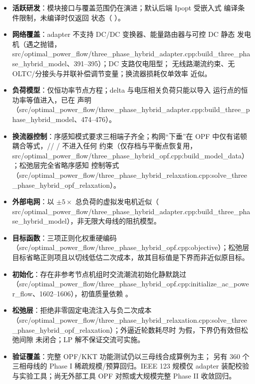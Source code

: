 \begin{itemize}
  \item \textbf{活跃研发}：模块接口与覆盖范围仍在演进；默认后端 Ipopt 受嵌入式
        编译条件限制，未编译时仅返回  状态（
        ）。
  \item \textbf{网络覆盖}：adapter 不支持 DC/DC 变换器、能量路由器与可控 DC 静态
        发电机（遇之抛错，src/optimal\_power\_flow/three\_phase\_hybrid\_adapter.cpp:build\_three\_phase\_hybrid\_model、391--395）；DC 支路仅电阻型；
        无线路潮流约束、无 OLTC/分接头与并联补偿调节变量；换流器损耗仅单效率
        近似。
  \item \textbf{负荷模型}：仅恒功率节点方程；delta 与电压相关负荷只能以导入
        运行点的恒功率等值进入，已在  声明
        （src/optimal\_power\_flow/three\_phase\_hybrid\_adapter.cpp:build\_three\_phase\_hybrid\_model、474--476）。
  \item \textbf{换流器控制}：序感知模式要求三相端子齐全；构网“下垂”在 OPF
        中仅有诺顿耦合等式，//%
        / 不进入任何
        约束（仅存档与平衡点恢复用，src/optimal\_power\_flow/three\_phase\_hybrid\_opf.cpp:build\_model\_data）；松弛层完全省略序感知
        控制等式（src/optimal\_power\_flow/three\_phase\_hybrid\_relaxation.cpp:solve\_three\_phase\_hybrid\_opf\_relaxation）。
  \item \textbf{外部电网}：以 $\pm5\times$ 总负荷的虚拟发电机近似（
        src/optimal\_power\_flow/three\_phase\_hybrid\_adapter.cpp:build\_three\_phase\_hybrid\_model），非无限大母线的阻抗模型。
  \item \textbf{目标函数}：三项正则化权重硬编码（src/optimal\_power\_flow/three\_phase\_hybrid\_opf.cpp:objective）；松弛层
        目标省略正则项且以切线低估二次成本，故其目标值是下界而非近似原目标。
  \item \textbf{初始化}：存在非参考节点机组时交流潮流初始化静默跳过
        （src/optimal\_power\_flow/three\_phase\_hybrid\_opf.cpp:initialize\_ac\_power\_flow、1602--1606），初值质量依赖 。
  \item \textbf{松弛层}：拒绝非零固定电流注入与负二次成本
        （src/optimal\_power\_flow/three\_phase\_hybrid\_relaxation.cpp:solve\_three\_phase\_hybrid\_opf\_relaxation）；外逼近轮数耗尽时
         为假，下界仍有效但松弛间隙
        未闭合；LP 解不保证交流可实施。
  \item \textbf{验证覆盖}：完整 OPF/KKT 功能测试仍以三母线合成算例为主；
        另有 360 个三相母线的 Phase I 稀疏规模/预算回归。IEEE 123 规模仅
        adapter 装配校验与实验工具；尚无外部工具 OPF 对照或大规模完整
        Phase II 收敛回归。
\end{itemize}
